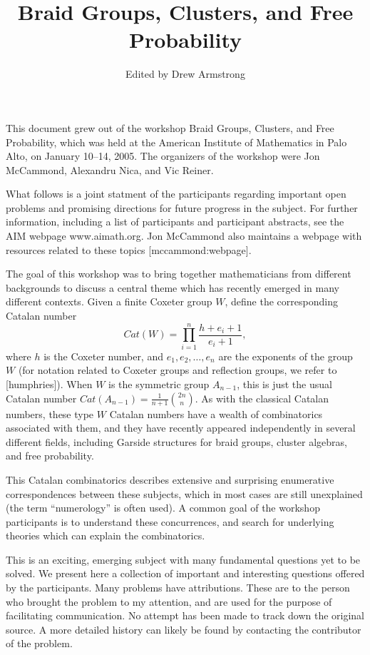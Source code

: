 \documentclass[12pt,letterpaper, reqno]{amsart}
\begin{document}
\title{Braid Groups, Clusters, and Free Probability}
\author{Edited by Drew Armstrong}


\maketitle

This document grew out of the workshop Braid Groups, Clusters,
and Free Probability, which was held at the American Institute of
Mathematics in Palo Alto, on January 10--14, 2005. The organizers of
the workshop were Jon McCammond, Alexandru Nica, and Vic Reiner.

What follows is a joint statment of the participants regarding important
open problems and promising directions for future progress in the
subject. For further information, including a list of participants and
participant abstracts, see the AIM webpage www.aimath.org. Jon
McCammond also maintains a webpage with resources related to these
topics [mccammond:webpage].

The goal of this workshop was to bring together mathematicians from
different backgrounds to discuss a central theme which has recently
emerged in many different contexts.  Given a finite Coxeter group $W$,
define the corresponding Catalan number
$$
Cat(W)=\prod_{i=1}^n \frac{h+e_i+1}{e_i+1},
$$
where $h$ is the Coxeter number, and $e_1,e_2,\ldots,e_n$ are the
exponents of the group $W$ (for notation related to Coxeter groups
and reflection groups, we refer to [humphries]). When $W$ is
the symmetric group $A_{n-1}$, this is just the usual Catalan number
$Cat(A_{n-1})=\frac{1}{n+1}\binom{2n}{n}$. As with the classical Catalan
numbers, these type $W$ Catalan numbers have a wealth of combinatorics
associated with them, and they have recently appeared independently in
several different fields, including Garside structures for braid groups,
cluster algebras, and free probability.

This Catalan combinatorics describes extensive and surprising
enumerative correspondences between these subjects, which in most cases
are still unexplained (the term ``numerology'' is often used). A common
goal of the workshop participants is to understand these concurrences,
and search for underlying theories which can explain the combinatorics.

This is an exciting, emerging subject with many fundamental questions
yet to be solved. We present here a collection of important and
interesting questions offered by the participants. Many problems have
attributions. These are to the person who brought the problem to my
attention, and are used for the purpose of facilitating communication. No
attempt has been made to track down the original source. A more detailed
history can likely be found by contacting the contributor of the problem.
\end{document}
